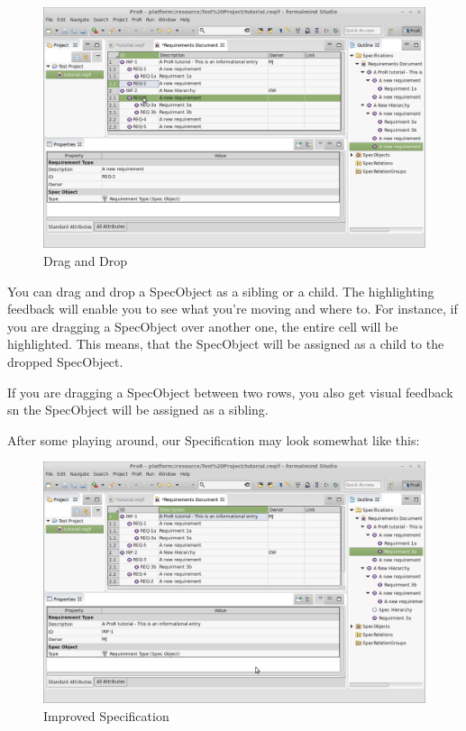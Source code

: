 \begin{figure}[h!]
\centering
\includegraphics[width=\linewidth]{../rmf-images/draganddrop.png}    
\caption{Drag and Drop}      
\label{fig:dragAndDropChild}
\end{figure}
You can drag and drop a SpecObject as a sibling or a child.  The highlighting feedback will enable you to see what you're moving and where to.  For instance, if you are dragging a SpecObject over another one, the entire cell will be highlighted.  This means, that the SpecObject will be assigned as a child to the dropped SpecObject.

If you are dragging a SpecObject between two rows, you also get visual feedback sn the SpecObject will be assigned as a sibling.

After some playing around, our Specification may look somewhat like this:

\begin{figure}[h!]
\centering      
\includegraphics[width=\linewidth]{../rmf-images/hierarchy_dad.png}      
\caption{Improved Specification}      
\label{fig:improvedSpec}
\end{figure}

